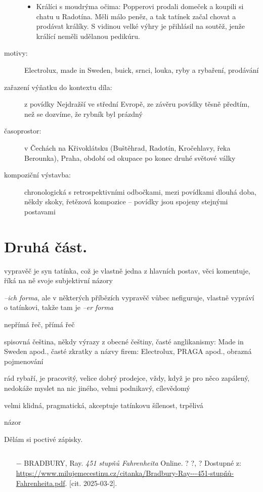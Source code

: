 \documentclass{article}
\begin{document}
\begin{description}
\begin{itemize}
   	\item Králíci s moudrýma očima: Popperovi prodali domeček a koupili si chatu u Radotína. Měli málo peněz, a tak tatínek začal chovat a prodávat králíky. S vidinou velké výhry je přihlásil na soutěž, jenže králící neměli udělanou pedikúru.
    \end{itemize}
    \item[motivy:] Electrolux, made in Sweden, buick, srnci, louka, ryby a rybaření, prodávání
    \item[zařazení výňatku do kontextu díla:] z povídky Nejdražší ve střední Evropě, ze závěru povídky těsně předtím, než se dozvíme, že rybník byl prázdný
    \item[časoprostor:] v Čechách na Křivoklátsku (Buštěhrad, Radotín, Kročehlavy, řeka Berounka), Praha, období od okupace po konec druhé světové války
    \item[kompoziční výstavba:] chronologická s retrospektivními odbočkami, mezi povídkami dlouhá doba, někdy skoky, řetězová kompozice -- povídky jsou spojeny stejnými postavami
\end{description}
\section{Druhá část.}
\begin{description}
    \setlength\itemsep{0.15em}
    \item[vypravěč:] vypravěč je syn tatínka, což je vlastně jedna z hlavních postav, věci komentuje, říká na ně svoje subjektivní názory
    \item[vyprávěcí způsoby:] \textit{--ich forma}, ale v některých příbězích vypravěč vůbec nefiguruje, vlastně vypráví o tatínkovi, takže tam je \textit{--er forma}
    \item[typy promluv:] nepřímá řeč, přímá řeč
    \item[jazyková stránka:] spisovná čeština, někdy výrazy z obecné češtiny, časté anglikanismy: Made in Sweden apod., časté zkratky a názvy firem: Electrolux, PRAGA apod., obrazná pojmenování
    \item[postavy:]
        \begin{description}
            \setlength\itemsep{0.15em}
 			\item[tatínek,] rád rybaří, je pracovitý, velice dobrý prodejce, vždy, když je pro něco zapálený, nedokáže myslet na nic jiného, velmi podnikavý, cílevědomý
            \item[maminka,] velmi klidná, pragmatická, akceptuje tatínkovu šílenost, trpělivá
        \end{description}
    \item[názor:] názor
    \item[kontext:]  Dělám si poctivé zápisky.
    \item[zdroje:] $ $
    \begin{itemize}
        \setlength\itemsep{0em}
        \item[$-$] BRADBURY, Ray. \textit{451 stupňů Fahrenheita} Online. ? ?, ? Dostupné z: \url{https://www.milujemecestinu.cz/citanka/Bradbury-Ray---451-stupňů-Fahrenheita.pdf}. [cit. 2025-03-2].
    \end{itemize}
\end{description}
\end{document}
